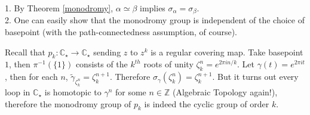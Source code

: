\begin{remark}
    1. By Theorem \ref{monodromy}, $\alpha\simeq\beta$ implies $\sigma_\alpha=\sigma_\beta$.\\
    2. One can easily show that the monodromy group is independent of the choice of basepoint (with the path-connectedness assumption, of course).
\end{remark}
\begin{example}
    Recall that $p_k:\mathbb C_\star\to\mathbb C_\star$ sending $z$ to $z^k$ is a regular covering map.
    Take basepoint $1$, then $\pi^{-1}(\{1\})$ consists of the $k^{th}$ roots of unity $\zeta_k^n=e^{2\pi in/k}$.
    Let $\gamma(t)=e^{2\pi it}$, then for each $n$, $\tilde{\gamma}_{\zeta_k^n}=\zeta_k^{n+1}$.
    Therefore $\sigma_\gamma(\zeta_k^n)=\zeta_k^{n+1}$.
    But it turns out every loop in $\mathbb C_\star$ is homotopic to $\gamma^n$ for some $n\in\mathbb Z$ (Algebraic Topology again!), therefore the monodromy group of $p_k$ is indeed the cyclic group of order $k$.
\end{example}